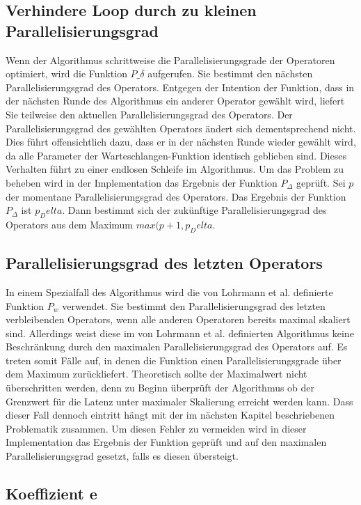 \subsection{Verhindere Loop durch zu kleinen Parallelisierungsgrad}
Wenn der Algorithmus schrittweise die Parallelisierungsgrade der Operatoren optimiert, wird die Funktion \(P\_\delta\) aufgerufen.
Sie bestimmt den nächsten Parallelisierungsgrad des Operators.
Entgegen der Intention der Funktion, dass in der nächsten Runde des Algorithmus ein anderer Operator gewählt wird, liefert Sie teilweise den aktuellen Parallelisierungsgrad des Operators.
Der Parallelisierungsgrad des gewählten Operators ändert sich dementsprechend nicht.
Dies führt offensichtlich dazu, dass er in der nächsten Runde wieder gewählt wird, da alle Parameter der Warteschlangen-Funktion identisch geblieben sind.
Dieses Verhalten führt zu einer endlosen Schleife im Algorithmus.
Um das Problem zu beheben wird in der Implementation das Ergebnis der Funktion \(P_\Delta\) geprüft.
Sei \(p\) der momentane Parallelisierungsgrad des Operators.
Das Ergebnis der Funktion \(P_\Delta\) ist \(p_Delta\).
Dann bestimmt sich der zukünftige Parallelisierungsgrad des Operators aus dem Maximum \(max(p+1, p_Delta\).

\subsection{Parallelisierungsgrad des letzten Operators}
In einem Spezialfall des Algorithmus wird die von Lohrmann et al. definierte Funktion \(P_w\) verwendet. 
Sie bestimmt den Parallelisierungsgrad des letzten verbleibenden Operators, wenn alle anderen Operatoren bereits maximal skaliert sind.
Allerdings weist diese im von Lohrmann et al. definierten Algorithmus keine Beschränkung durch den maximalen Parallelisierungsgrad des Operators auf. 
Es treten somit Fälle auf, in denen die Funktion einen Parallelisierungsgrade über dem Maximum zurückliefert.
Theoretisch sollte der Maximalwert nicht überschritten werden, denn zu Beginn überprüft der Algorithmus ob der Grenzwert für die Latenz unter maximaler Skalierung erreicht werden kann.
Dass dieser Fall dennoch eintritt hängt mit der im nächsten Kapitel beschriebenen Problematik zusammen.
Um diesen Fehler zu vermeiden wird in dieser Implementation das Ergebnis der Funktion geprüft und auf den maximalen Parallelisierungsgrad gesetzt, falls es diesen übersteigt.

\subsection{Koeffizient e}

